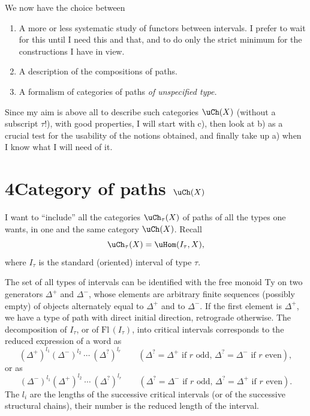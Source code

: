 We now have the choice between

\begin{enumerate}[label=\alph*)]
\item A more or less systematic study of functors between intervals. I prefer to wait for this until I need this and that, and to do only the strict minimum for the constructions I have in view.
\item A description of the compositions of paths. %
\item A formalism of categories of paths \textit{of unspecified type.}
\end{enumerate}

Since my aim is above all to describe such categories $\uCh(X)$ (without a subscript $\tau$!), with good properties, I will start with c), then look at b) as a crucial test for the usability of the notions obtained, and finally take up a) when I know what I will need of it.


\section*{4\quad Category of paths $\uCh(X)$}

I want to ``include'' all the categories $\uCh_\tau(X)$ of paths of all the types one wants, in one and the same category $\uCh(X)$. Recall
\[
\uCh_\tau(X)=\uHom(I_\tau,X),
\]
where $I_\tau$ is the standard (oriented) interval of type $\tau$.

The set of all types of intervals
can be identified with the free monoid Ty on two generators $\Delta^+$ and $\Delta^-$, whose elements are arbitrary finite sequences (possibly empty) of objects alternately equal to $\Delta^+$ and to $\Delta^-$. If the first element is $\Delta^+$, we have a type of path with direct initial direction, retrograde otherwise. The decomposition of $I_\tau$, or of $\mathrm{Fl}\,(I_\tau)$, into critical intervals corresponds to the reduced expression of a word as %
\[
(\Delta^+)^{l_1}(\Delta^-)^{l_2}\ \cdots\ (\Delta^?)^{l_r} \qquad (\Delta^?=\Delta^+ \text{ if } r \text{ odd, } \Delta^?=\Delta^- \text{ if } r \text{ even}),
\]
or as
\[
(\Delta^-)^{l_1}(\Delta^+)^{l_2}\ \cdots\ (\Delta^?)^{l_r} \qquad (\Delta^?=\Delta^- \text{ if } r \text{ odd, } \Delta^?=\Delta^+ \text{ if } r \text{ even}).
\]
The $l_i$ are the lengths of the successive critical intervals (or of the successive structural chains), their number is the reduced length of the interval.

